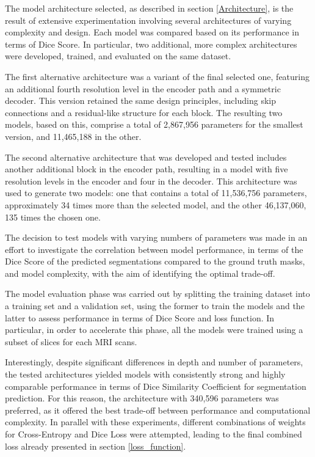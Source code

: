 \documentclass[10pt,twocolumn,letterpaper]{article}
\begin{document}
The model architecture selected, as described in section \ref{Architecture}, is the result of extensive experimentation involving several architectures of varying complexity and design. Each model was compared based on its performance in terms of Dice Score.
In particular, two additional, more complex architectures were developed, trained, and evaluated on the same dataset.

The first alternative architecture was a variant of the final selected one, featuring an additional fourth resolution level in the encoder path and a symmetric decoder. This version retained the same design principles, including skip connections and a residual-like structure for each block. The resulting two models, based on this, comprise a total of 2,867,956 parameters for the smallest version, and 11,465,188 in the other.

The second alternative architecture that was developed and tested includes another additional block in the encoder path, resulting in a model with five resolution levels in the encoder and four in the decoder. This architecture was used to generate two models: one that contains a total of 11,536,756 parameters, approximately 34 times more than the selected model, and the other 46,137,060, 135 times the chosen one.

The decision to test models with varying numbers of parameters was made in an effort to investigate the correlation between model performance, in terms of the Dice Score of the predicted segmentations compared to the ground truth masks, and model complexity, with the aim of identifying the optimal trade-off.

The model evaluation phase was carried out by splitting the training dataset into a training set and a validation set, using the former to train the models and the latter to assess performance in terms of Dice Score and loss function. In particular, in order to accelerate this phase, all the models were trained using a subset of slices for each MRI scans.

Interestingly, despite significant differences in depth and number of parameters, the tested architectures yielded models with consistently strong and highly comparable performance in terms of  Dice Similarity Coefficient for segmentation prediction.
For this reason, the architecture with 340,596 parameters was preferred, as it offered the best trade-off between performance and computational complexity. In parallel with these experiments, different combinations of weights for Cross-Entropy and Dice Loss were attempted, leading to the final combined loss already presented in section \ref{loss_function}.
\end{document}
